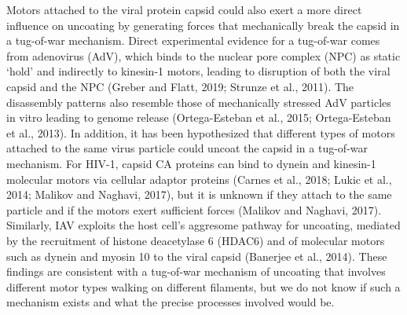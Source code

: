 Motors attached to the viral protein capsid could also exert a more direct influence on uncoating by generating forces that mechanically break the capsid in a tug-of-war mechanism. Direct experimental evidence for a tug-of-war comes from adenovirus (AdV), which binds to the nuclear pore complex (NPC) as static ‘hold’ and indirectly to kinesin-1 motors, leading to disruption of both the viral capsid and the NPC (Greber and Flatt, 2019; Strunze et al., 2011). The disassembly patterns also resemble those of mechanically stressed AdV particles in vitro leading to genome release (Ortega-Esteban et al., 2015; Ortega-Esteban et al., 2013). In addition, it has been hypothesized that different types of motors attached to the same virus particle could uncoat the capsid in a tug-of-war mechanism. For HIV-1, capsid CA proteins can bind to dynein and kinesin-1 molecular motors via cellular adaptor proteins (Carnes et al., 2018; Lukic et al., 2014; Malikov and Naghavi, 2017), but it is unknown if they attach to the same particle and if the motors exert sufficient forces (Malikov and Naghavi, 2017). Similarly, IAV exploits the host cell’s aggresome pathway for uncoating, mediated by the recruitment of histone deacetylase 6 (HDAC6) and of molecular motors such as dynein and myosin 10 to the viral capsid (Banerjee et al., 2014). These findings are consistent with a tug-of-war mechanism of uncoating that involves different motor types walking on different filaments, but we do not know if such a mechanism exists and what the precise processes involved would be.
